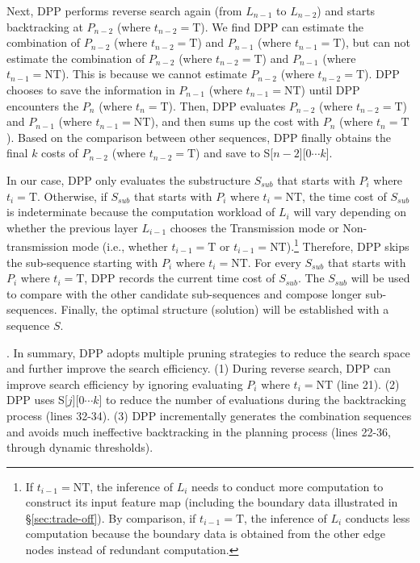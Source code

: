 Next, DPP performs reverse search again (from $L_{n-1}$ to $L_{n-2}$) and starts backtracking at $P_{n-2}$ (where $t_{n-2}=\text{T}$). We find DPP can estimate the combination of $P_{n-2}$ (where $t_{n-2}=\text{T}$) and $P_{n-1}$ (where $t_{n-1}=\text{T}$), but can not estimate the combination of $P_{n-2}$ (where $t_{n-2}=\text{T}$) and $P_{n-1}$ (where $t_{n-1}=\text{NT}$). This is because we cannot estimate $P_{n-2}$ (where $t_{n-2}=\text{T}$). DPP chooses to save the information in $P_{n-1}$ (where $t_{n-1}=\text{NT}$) until DPP encounters the $P_n$ (where $t_n=\text{T}$). Then, DPP evaluates $P_{n-2}$ (where $t_{n-2}=\text{T}$) and $P_{n-1}$ (where $t_{n-1}=\text{NT}$), and then sums up the cost with $P_n$ (where $t_n=\text{T}$). Based on the comparison between other sequences, DPP finally obtains the final $k$ costs of $P_{n-2}$ (where $t_{n-2}=\text{T}$) and save to S[$n-2$][$0\cdots k$]. 

 In our case, DPP only evaluates the substructure $S_{sub}$ that starts with $P_{i}$ where $t_i=\text{T}$. Otherwise, if $S_{sub}$ that starts with $P_{i}$ where $t_i=\text{NT}$, the time cost of $S_{sub}$ is indeterminate because the computation workload of $L_{i}$ will vary depending on whether the previous layer $L_{i-1}$ chooses the Transmission mode or Non-transmission mode (i.e., whether $t_{i-1}=\text{T}$ or $t_{i-1}=\text{NT}$).\footnote{If $t_{i-1}=\text{NT}$, the inference of $L_{i}$ needs to conduct more computation to construct its input feature map (including the boundary data illustrated in \S\ref{sec:trade-off}). By comparison, if $t_{i-1}=\text{T}$, the inference of $L_{i}$  conducts less computation because the boundary data is obtained from the other edge nodes instead of redundant computation.} Therefore, DPP skips the sub-sequence starting with $P_i$ where $t_i=\text{NT}$. For every $S_{sub}$ that starts with $P_i$ where $t_i=\text{T}$, DPP records the current time cost of $S_{sub}$. The $S_{sub}$ will be used to compare with the other candidate sub-sequences and compose longer sub-sequences. Finally, the optimal structure (solution) will be established with a sequence $S$.

. In summary, DPP adopts multiple pruning strategies to reduce the search space and further improve the search efficiency. (1) During reverse search, DPP can improve search efficiency by ignoring evaluating $P_i$ where $t_i=\text{NT}$ (line 21). (2) DPP uses S[$j$][$0\cdots k$] to reduce the number of evaluations during the backtracking process (lines 32-34). (3) DPP incrementally generates the combination sequences and avoids much ineffective backtracking in the planning process (lines 22-36, through dynamic thresholds).


